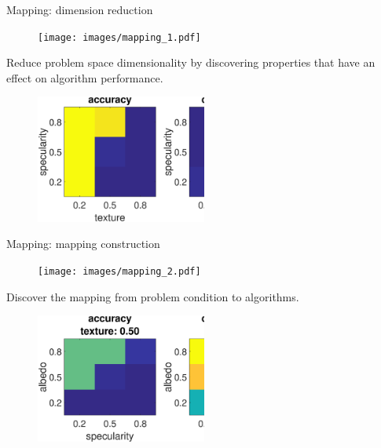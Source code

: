 \documentclass[10pt]{beamer}
\begin{document}


\begin{frame}{Mapping: dimension reduction}

\begin{figure}
\centering
\texttt{[image: images/mapping\_1.pdf]}
\end{figure}

Reduce problem space dimensionality by discovering properties that have an effect on algorithm performance.

\begin{figure}
\centering
\includegraphics[width=0.5\textwidth]{mapping/eval_prop/mvs_tex_spec}
\end{figure}

\end{frame}

\begin{frame}{Mapping: mapping construction}

\begin{figure}
\centering
\texttt{[image: images/mapping\_2.pdf]}
\end{figure}

Discover the mapping from problem condition to algorithms.
\begin{figure}
\centering
\includegraphics[width=0.5\textwidth]{mapping/lookup_table/mvs_texture_05}
\end{figure}

\end{frame}
\end{document}
